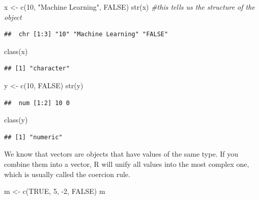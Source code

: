 \documentclass[
]{book}
\newenvironment{Shaded}{\begin{snugshade}}{\end{snugshade}}
\newcommand{\CommentTok}[1]{\textcolor[rgb]{0.56,0.35,0.01}{\textit{#1}}}
\newcommand{\ConstantTok}[1]{\textcolor[rgb]{0.00,0.00,0.00}{#1}}
\newcommand{\DecValTok}[1]{\textcolor[rgb]{0.00,0.00,0.81}{#1}}
\newcommand{\FunctionTok}[1]{\textcolor[rgb]{0.00,0.00,0.00}{#1}}
\newcommand{\NormalTok}[1]{#1}
\newcommand{\OtherTok}[1]{\textcolor[rgb]{0.56,0.35,0.01}{#1}}
\newcommand{\SpecialCharTok}[1]{\textcolor[rgb]{0.00,0.00,0.00}{#1}}
\newcommand{\StringTok}[1]{\textcolor[rgb]{0.31,0.60,0.02}{#1}}
\theoremstyle{definition}
\theoremstyle{definition}
\theoremstyle{definition}
\theoremstyle{definition}
\theoremstyle{remark}
\begin{document}
\begin{Shaded}
\begin{Highlighting}[]
\NormalTok{x }\OtherTok{\textless{}{-}} \FunctionTok{c}\NormalTok{(}\DecValTok{10}\NormalTok{, }\StringTok{"Machine Learning"}\NormalTok{, }\ConstantTok{FALSE}\NormalTok{) }
\FunctionTok{str}\NormalTok{(x) }\CommentTok{\#this tells us the structure of the object}
\end{Highlighting}
\end{Shaded}

\begin{verbatim}
##  chr [1:3] "10" "Machine Learning" "FALSE"
\end{verbatim}

\begin{Shaded}
\begin{Highlighting}[]
\FunctionTok{class}\NormalTok{(x)}
\end{Highlighting}
\end{Shaded}

\begin{verbatim}
## [1] "character"
\end{verbatim}

\begin{Shaded}
\begin{Highlighting}[]
\NormalTok{y }\OtherTok{\textless{}{-}} \FunctionTok{c}\NormalTok{(}\DecValTok{10}\NormalTok{, }\ConstantTok{FALSE}\NormalTok{)}
\FunctionTok{str}\NormalTok{(y)}
\end{Highlighting}
\end{Shaded}

\begin{verbatim}
##  num [1:2] 10 0
\end{verbatim}

\begin{Shaded}
\begin{Highlighting}[]
\FunctionTok{class}\NormalTok{(y)}
\end{Highlighting}
\end{Shaded}

\begin{verbatim}
## [1] "numeric"
\end{verbatim}

We know that vectors are objects that have values of the same type. If you combine them into a vector, R will unify all values into the most complex one, which is usually called the coercion rule.

\begin{Shaded}
\begin{Highlighting}[]
\NormalTok{m }\OtherTok{\textless{}{-}} \FunctionTok{c}\NormalTok{(}\ConstantTok{TRUE}\NormalTok{, }\DecValTok{5}\NormalTok{, }\SpecialCharTok{{-}}\DecValTok{2}\NormalTok{, }\ConstantTok{FALSE}\NormalTok{)}
\NormalTok{m}
\end{Highlighting}
\end{Shaded}
\end{document}
